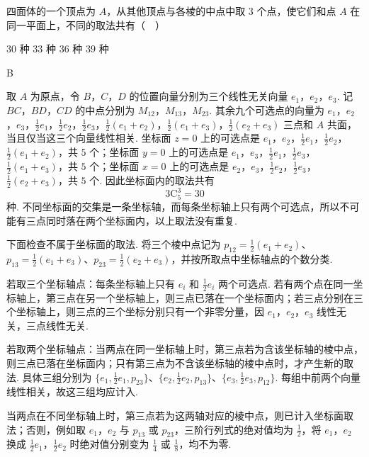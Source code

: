 \begin{problem}
四面体的一个顶点为 \(A\)，从其他顶点与各棱的中点中取 \(3\) 个点，使它们和点 \(A\) 在同一平面上，不同的取法共有（\(\quad\)）

\choices
    {\(30\) 种}
    {\(33\) 种}
    {\(36\) 种}
    {\(39\) 种}

\end{problem}

\begin{answer}
B
\end{answer}

\begin{solution}
    取 \(A\) 为原点，令 \(B\)，\(C\)，\(D\) 的位置向量分别为三个线性无关向量 \(e_1\)，\(e_2\)，\(e_3\). 记 \(BC\)，\(BD\)，\(CD\) 的中点分别为 \(M_{12}\)，\(M_{13}\)，\(M_{23}\). 其余九个可选点的向量为
\(e_1\)，\(e_2\)，\(e_3\)，\(\frac12e_1\)，\(\frac12e_2\)，\(\frac12e_3\)，\(\frac12(e_1+e_2)\)，\(\frac12(e_1+e_3)\)，\(\frac12(e_2+e_3)\)
三点和 \(A\) 共面，当且仅当这三个向量线性相关. 坐标面 \(z=0\) 上的可选点是 \(e_1\)，\(e_2\)，\(\frac12e_1\)，\(\frac12e_2\)，\(\frac12(e_1+e_2)\)，共 \(5\) 个；坐标面 \(y=0\) 上的可选点是 \(e_1\)，\(e_3\)，\(\frac12e_1\)，\(\frac12e_3\)，\(\frac12(e_1+e_3)\)，共 \(5\) 个；坐标面 \(x=0\) 上的可选点是 \(e_2\)，\(e_3\)，\(\frac12e_2\)，\(\frac12e_3\)，\(\frac12(e_2+e_3)\)，共 \(5\) 个. 因此坐标面内的取法共有
\[
3\mathrm C_5^3=30
\]
种. 不同坐标面的交集是一条坐标轴，而每条坐标轴上只有两个可选点，所以不可能有三点同时落在两个坐标面内，以上取法没有重复.

下面检查不属于坐标面的取法. 将三个棱中点记为 \(p_{12}=\frac12(e_1+e_2)\)、\(p_{13}=\frac12(e_1+e_3)\)、\(p_{23}=\frac12(e_2+e_3)\)，并按所取点中坐标轴点的个数分类.

若取三个坐标轴点：每条坐标轴上只有 \(e_i\) 和 \(\frac12e_i\) 两个可选点. 若有两个点在同一坐标轴上，第三点在另一个坐标轴上，则三点已落在一个坐标面内；若三点分别在三个坐标轴上，则三点的三个坐标分别只有一个非零分量，因 \(e_1\)，\(e_2\)，\(e_3\) 线性无关，三点线性无关.

若取两个坐标轴点：当两点在同一坐标轴上时，第三点若为含该坐标轴的棱中点，则三点已落在坐标面内；只有第三点为不含该坐标轴的棱中点时，才产生新的取法. 具体三组分别为 \(\{e_1,\frac12e_1,p_{23}\}\)、\(\{e_2,\frac12e_2,p_{13}\}\)、\(\{e_3,\frac12e_3,p_{12}\}\). 每组中前两个向量线性相关，故这三组均应计入.

当两点在不同坐标轴上时，第三点若为这两轴对应的棱中点，则已计入坐标面取法；否则，例如取 \(e_1\)，\(e_2\) 与 \(p_{13}\) 或 \(p_{23}\)，三阶行列式的绝对值均为 \(\frac12\)，将 \(e_1\)，\(e_2\) 换成 \(\frac12e_1\)，\(\frac12e_2\) 时绝对值分别变为 \(\frac14\) 或 \(\frac18\)，均不为零.


\end{solution}
